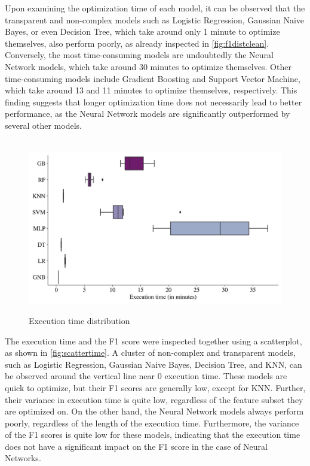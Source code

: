 Upon examining the optimization time of each model, it can be observed that the transparent and non-complex models such as Logistic Regression, Gaussian Naive Bayes, or even Decision Tree, which take around only 1 minute to optimize themselves, also perform poorly, as already inspected in \autoref{fig:f1distclean}.
Conversely, the most time-consuming models are undoubtedly the Neural Network models, which take around 30 minutes to optimize themselves. Other time-consuming models include Gradient Boosting and Support Vector Machine, which take around 13 and 11 minutes to optimize themselves, respectively.
This finding suggests that longer optimization time does not necessarily lead to better performance, as the Neural Network models are significantly outperformed by several other models.
\begin{figure}[H]
\centering
\caption{Execution time distribution}\vspace{0.5em}
\label{fig:timedist}\
\includegraphics[width=140mm]{Figures/EXECUTION_TIME_Distribution.jpg}
\centering{\begin{source}Author's results in Python\end{source}}\vspace{-1em}
\end{figure}

The execution time and the F1 score were inspected together using a scatterplot, as shown in \autoref{fig:scattertime}.
A cluster of non-complex and transparent models, such as Logistic Regression, Gaussian Naive Bayes, Decision Tree, and KNN, can be observed around the vertical line near 0 execution time. These models are quick to optimize, but their F1 scores are generally low, except for KNN.
Further, their variance in execution time is quite low, regardless of the feature subset they are optimized on.
On the other hand, the Neural Network models always perform poorly, regardless of the length of the execution time. Furthermore, the variance of the F1 scores is quite low for these models, indicating that the execution time does not have a significant impact on the F1 score in the case of Neural Networks.

